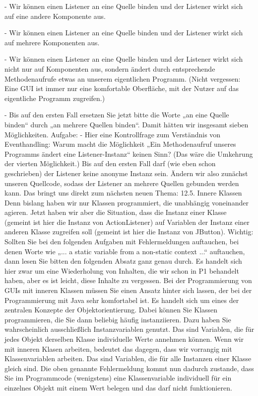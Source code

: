 -	Wir können einen Listener an eine Quelle binden und der Listener wirkt sich auf eine andere Komponente aus.

-	Wir können einen Listener an eine Quelle binden und der Listener wirkt sich auf mehrere Komponenten aus.

-	Wir können einen Listener an eine Quelle binden und der Listener wirkt sich nicht nur auf Komponenten aus, sondern ändert durch entsprechende Methodenaufrufe etwas an unserem eigentlichen Programm. (Nicht vergessen: Eine GUI ist immer nur eine komfortable Oberfläche, mit der Nutzer auf das eigentliche Programm zugreifen.)

-	Bis auf den ersten Fall ersetzen Sie jetzt bitte die Worte „an eine Quelle binden“ durch „an mehrere Quellen binden“. Damit hätten wir insgesamt sieben Möglichkeiten. 
Aufgabe:
-	Hier eine Kontrollfrage zum Verständnis von Eventhandling: Warum macht die Möglichkeit „Ein Methodenaufruf unseres Programms ändert eine Listener-Instanz“ keinen Sinn? (Das wäre die Umkehrung der vierten Möglichkeit.)
Bis auf den ersten Fall darf (wie eben schon geschrieben) der Listener keine anonyme Instanz sein. Ändern wir also zunächst unseren Quellcode, sodass der Listener an mehrere Quellen gebunden werden kann. Das bringt uns direkt zum nächsten neuen Thema:
12.5.	Innere Klassen
Denn bislang haben wir nur Klassen programmiert, die unabhängig voneinander agieren. Jetzt haben wir aber die Situation, dass die Instanz einer Klasse (gemeint ist hier die Instanz von ActionListener) auf Variablen der Instanz einer anderen Klasse zugreifen soll (gemeint ist hier die Instanz von JButton).
Wichtig: Sollten Sie bei den folgenden Aufgaben mit Fehlermeldungen auftauchen, bei denen Worte wie „... a static variable from a non-static context ...“ auftauchen, dann lesen Sie bitten den folgenden Absatz ganz genau durch. Es handelt sich hier zwar um eine Wiederholung von Inhalten, die wir schon in P1 behandelt haben, aber es ist leicht, diese Inhalte zu vergessen.
Bei der Programmierung von GUIs mit inneren Klassen müssen Sie einen Ansatz hinter sich lassen, der bei der Programmierung mit Java sehr komfortabel ist. Es handelt sich um eines der zentralen Konzepte der Objektorientierung. Dabei können Sie Klassen programmieren, die Sie dann beliebig häufig instanziieren. Dazu haben Sie wahrscheinlich ausschließlich Instanzvariablen genutzt. Das sind Variablen, die für jedes Objekt derselben Klasse individuelle Werte annehmen können. Wenn wir mit inneren Klasen arbeiten, bedeutet das dagegen, dass wir vorrangig mit Klassenvariablen arbeiten. Das sind Variablen, die für alle Instanzen einer Klasse gleich sind. Die oben genannte Fehlermeldung kommt nun dadurch zustande, dass Sie im Programmcode (wenigstens) eine Klassenvariable individuell für ein einzelnes Objekt mit einem Wert belegen und das darf nicht funktionieren.
